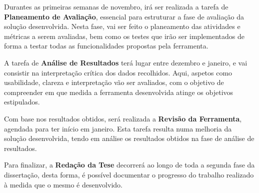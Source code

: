 Durantes as primeiras semanas de novembro, irá ser realizada a tarefa de \textbf{Planeamento de Avaliação}, essencial para estruturar a fase de avaliação da solução desenvolvida. Nesta fase, vai ser feito o planeamento das atividades e métricas a serem avaliadas, bem como os testes que irão ser implementados de forma a testar todas as funcionalidades propostas pela ferramenta.

A tarefa de \textbf{Análise de Resultados} terá lugar entre dezembro e janeiro, e vai consistir na interpretação crítica dos dados recolhidos. Aqui, aspetos como usabilidade, clareza e interpretação vão ser avaliados, com o objetivo de compreender em que medida a ferramenta desenvolvida atinge os objetivos estipulados.

Com base nos resultados obtidos, será realizada a \textbf{Revisão da Ferramenta}, agendada para ter início em janeiro. Esta tarefa resulta numa melhoria da solução desenvolvida, tendo em análise os resultados obtidos na fase de análise de resultados.

Para finalizar, a \textbf{Redação da Tese} decorrerá ao longo de toda a segunda fase da dissertação, desta forma, é possível documentar o progresso do trabalho realizado à medida que o mesmo é desenvolvido.
